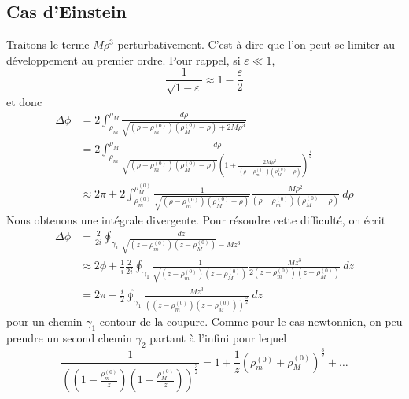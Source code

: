 \documentclass[a4paper,11pt]{report}
\theoremstyle{definition}
\theoremstyle{plain}
\theoremstyle{definition}
\theoremstyle{remark}
\begin{document}
        \subsection{Cas d'Einstein}
        
            Traitons le terme $M\rho^3$ perturbativement. C'est-à-dire que l'on peut se limiter au développement au premier ordre. Pour rappel, si $\varepsilon\ll1$,
            \begin{equation}
                \frac{1}{\sqrt{1-\varepsilon}}\approx1-\frac{\varepsilon}{2}
            \end{equation}
            et donc
            \begin{align}
                \Delta\phi &= 2\int^{\rho_M}_{\rho_m}\frac{d\rho}{\sqrt{\left( \rho-\rho^{(0)}_m \right)\left( \rho^{(0)}_M-\rho \right)+2M\rho^3}}\\
                &= 2\int^{\rho_M}_{\rho_m}\frac{d\rho}{\sqrt{\left( \rho-\rho^{(0)}_m \right)\left( \rho^{(0)}_M-\rho \right)}\left( 1+\frac{2M\rho^3}{\left( \rho-\rho^{(0)}_m \right)\left( \rho^{(0)}_M-\rho \right)} \right)^{\frac{1}{2}}} \\
                &\approx 2\pi + 2\int^{\rho^{(0)}_M}_{\rho^{(0)}_m}\frac{1}{\sqrt{\left( \rho-\rho^{(0)}_m \right)\left( \rho^{(0)}_M-\rho \right)}}\frac{M\rho^2}{\left( \rho-\rho^{(0)}_m \right)\left( \rho^{(0)}_M-\rho \right)} ~d\rho
            \end{align}
            Nous obtenons une intégrale divergente. Pour résoudre cette difficulté, on écrit
            \begin{align}
                \Delta\phi &= \frac{2}{2i}\oint_{\gamma_1}\frac{dz}{\sqrt{\left( z-\rho^{(0)}_m \right)\left( z-\rho^{(0)}_M \right)}-Mz^3}\\
                &\approx 2\phi+\frac{1}{i}\frac{2}{2i}\oint_{\gamma_1}\frac{1}{\sqrt{\left( z-\rho^{(0)}_m \right)\left( z-\rho^{(0)}_M \right)}}\frac{Mz^3}{2\left( z-\rho^{(0)}_m \right)\left( z-\rho^{(0)}_M \right)}~dz\\
                &= 2\pi-\frac{i}{2}\oint_{\gamma_1}\frac{Mz^3}{\left(\left( z-\rho^{(0)}_m \right)\left( z-\rho^{(0)}_M \right)\right)^{\frac{3}{2}}}~dz
            \end{align}
            pour un chemin $\gamma_1$ contour de la coupure. Comme pour le cas newtonnien, on peu prendre un second chemin $\gamma_2$ partant à l'infini pour lequel
            \begin{equation}
                \frac{1}{\left(\left( 1-\frac{\rho^{(0)}_m}{z} \right)\left( 1-\frac{\rho^{(0)}_M}{z} \right)\right)^{\frac{3}{2}}} = 1+\frac{1}{z}(\rho^{(0)}_m+\rho^{(0)}_M)^{\frac{3}{2}}+\dots
            \end{equation}
\end{document}
